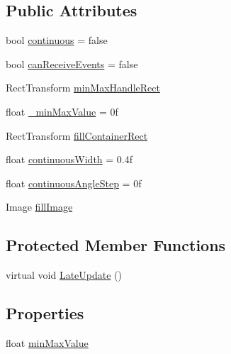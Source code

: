 \subsection*{Public Attributes}
\begin{DoxyCompactItemize}
\item 
bool \hyperlink{class_unity_engine_1_1_u_i_1_1_windows_1_1_extensions_1_1_slider_abb00da6ff06ac8011e1937e3e133f6d1}{continuous} = false
\item 
bool \hyperlink{class_unity_engine_1_1_u_i_1_1_windows_1_1_extensions_1_1_slider_a096000afb5abb94510c86605803d73d9}{can\+Receive\+Events} = false
\item 
Rect\+Transform \hyperlink{class_unity_engine_1_1_u_i_1_1_windows_1_1_extensions_1_1_slider_ac89c993540a3cabbc72e019974abd189}{min\+Max\+Handle\+Rect}
\item 
float \hyperlink{class_unity_engine_1_1_u_i_1_1_windows_1_1_extensions_1_1_slider_a1ee4944c56b03f704713ae9dbc68b2ea}{\+\_\+min\+Max\+Value} = 0f
\item 
Rect\+Transform \hyperlink{class_unity_engine_1_1_u_i_1_1_windows_1_1_extensions_1_1_slider_a30d77070c7d3c3367ca1bf0d52c3c8bd}{fill\+Container\+Rect}
\item 
float \hyperlink{class_unity_engine_1_1_u_i_1_1_windows_1_1_extensions_1_1_slider_ae061ca4766a69e1310653c1a236b4ffe}{continuous\+Width} = 0.\+4f
\item 
float \hyperlink{class_unity_engine_1_1_u_i_1_1_windows_1_1_extensions_1_1_slider_a18f304a46a337375b97309eed114a1f7}{continuous\+Angle\+Step} = 0f
\item 
Image \hyperlink{class_unity_engine_1_1_u_i_1_1_windows_1_1_extensions_1_1_slider_a6a23691d195c04f7fea3606c8ac4cc0d}{fill\+Image}
\end{DoxyCompactItemize}
\subsection*{Protected Member Functions}
\begin{DoxyCompactItemize}
\item 
virtual void \hyperlink{class_unity_engine_1_1_u_i_1_1_windows_1_1_extensions_1_1_slider_a9c2a9cce825dac0fa89d61108834a00b}{Late\+Update} ()
\end{DoxyCompactItemize}
\subsection*{Properties}
\begin{DoxyCompactItemize}
\item 
float \hyperlink{class_unity_engine_1_1_u_i_1_1_windows_1_1_extensions_1_1_slider_a70fcbd7a720f6e546ab4df5b7fcae9cc}{min\+Max\+Value}
\end{DoxyCompactItemize}


